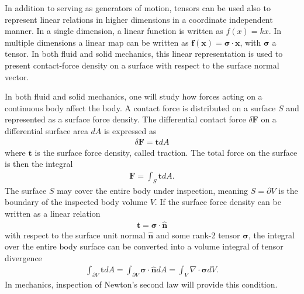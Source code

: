 In addition to serving as generators of motion, tensors can be used also to represent linear relations in higher dimensions in a coordinate independent manner. In a single dimension, a linear function is written as $f(x)=kx$. In multiple dimensions a linear map can be written as $\bm{f}(\bm{x})=\bm{\sigma}\cdot\bm{x}$, with $\bm{\sigma}$ a tensor. In both fluid and solid mechanics, this linear representation is used to present contact-force density on a surface with respect to the surface normal vector.
\begin{example}
    \label{ex:tensor_linear_relation}
    In both fluid and solid mechanics, one will study how forces acting on a continuous body affect the body. A contact force is distributed on a surface $S$ and represented as a surface force density. The differential contact force $\delta\bm{F}$ on a differential surface area $dA$ is expressed as
    \begin{align}
        \delta\bm{F}=\bm{t}dA
    \end{align}
    where $\bm{t}$ is the surface force density, called traction. The total force on the surface is then the integral
    \begin{align*}
        \bm{F}=\int_{S}\bm{t}dA.
    \end{align*}
    The surface $S$ may cover the entire body under inspection, meaning $S=\partial V$ is the boundary of the inspected body volume $V$. If the surface force density can be written as a linear relation 
    \begin{align*}
        \bm{t}=\bm{\sigma}\cdot\bm{\hat{n}}
    \end{align*}
    with respect to the surface unit normal $\bm{\hat{n}}$ and some rank-2 tensor $\bm{\sigma}$, the integral over the entire body surface can be converted into a volume integral of tensor divergence
    \begin{align*}
        \int_{\partial V}\bm{t}dA=\int_{\partial V}\bm{\sigma}\cdot\bm{\hat{n}}dA=\int_{V}\nabla\cdot\bm{\sigma}dV.
    \end{align*}
    In mechanics, inspection of Newton's second law will provide this condition.
\end{example}

